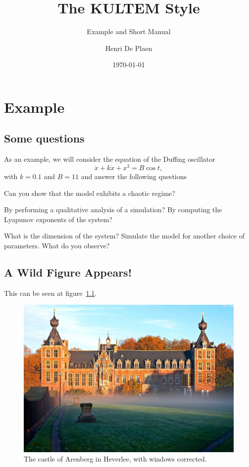 \documentclass[oneside,a4paper,11pt,explicit]{book}
\title{The KULTEM Style}
\subtitle{Example and Short Manual}
\date{\today}
\author{Henri De Plaen}
\begin{document}
\maketitle

\chapter{Example}
\lipsum[1]

\section{Some questions}
\lipsum[2]

As an example, we will consider the equation of the Duffing oscillator
\begin{equation}
\ddot{x}+k\dot{x}+x^3=B\cos t,
\end{equation}
with $k=0.1$ and $B=11$ and answer the following questions

\begin{questions}
\question Can you show that the model exhibits a chaotic regime?
\begin{tasks}
\task By performing a qualitative analysis of a simulation?
\task By computing the Lyapunov exponents of the system?
\end{tasks}
\question What is the dimension of the system?
\question Simulate the model for another choice of parameters. What do you observe?
\end{questions}

\section{A Wild Figure Appears!}
\lipsum[3] This can be seen at figure~\ref{fig:example}.

\begin{figure}[h]
    \centering
    \includegraphics[width=\textwidth]{img/arenberg.jpg}
    \caption{The castle of Arenberg in Heverlee, with windows corrected.}
    \label{fig:example}
\end{figure}
\end{document}

